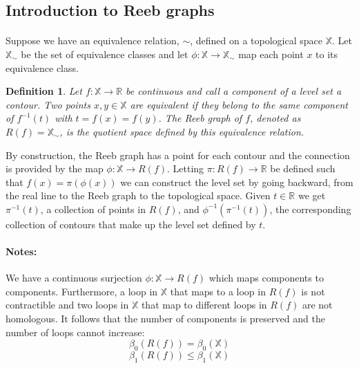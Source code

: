 \documentclass[]{article}
\newtheorem{definition}{Definition}
\newcommand{\R}{\mathbb{R}}
\newcommand{\X}{\mathbb{X}}
\begin{document}
     \subsection{Introduction to Reeb graphs}
     \paragraph{}
      Suppose we have an equivalence relation, $\sim$, defined on a topological space $\X$. Let $\X_\sim$
      be the set of equivalence classes and let $\phi : \X \to \X_\sim$ map each point $x$ to its equivalence class.

\begin{definition}
      Let $f: \X \to \R$ be continuous and call a component of a level set a contour. Two
      points $x,y \in \X$ are equivalent if they belong to the same component of $f^{-1}(t)$
      with $t=f(x)=f(y)$. The Reeb graph of $f$, denoted as $R(f)=\X_\sim$, is the quotient space 
      defined by this equivalence relation.
  \end{definition}
      By construction, the Reeb graph has a point for each contour and the connection is 
      provided by the map $\phi:\X\to R(f)$. Letting $\pi:R(f)\to\R$ be defined such that $f(x)=\pi(\phi(x))$
      we can construct the level set by going backward, from the real line to the Reeb graph to the 
      topological space. Given $t\in\R$ we get $\pi^{-1}(t)$, a collection of points in $R(f)$,
      and $\phi^{-1}(\pi^{-1}(t))$, the corresponding collection of contours that make up the level set defined by $t$.

      \paragraph{Notes:}We have a continuous surjection $\phi:\X\to R(f)$ which maps components 
      to components. Furthermore, a loop in $\X$ that maps to a loop in $R(f)$ is not contractible
      and two loops in $\X$ that map to different loops in $R(f)$ are not homologous. It follows
      that the number of components is preserved and the number of loops cannot increase:
      $$
      \beta_0(R(f))=\beta_0(\X)
      $$
      $$
      \beta_1(R(f))\le\beta_1(\X)
      $$

\end{document}
